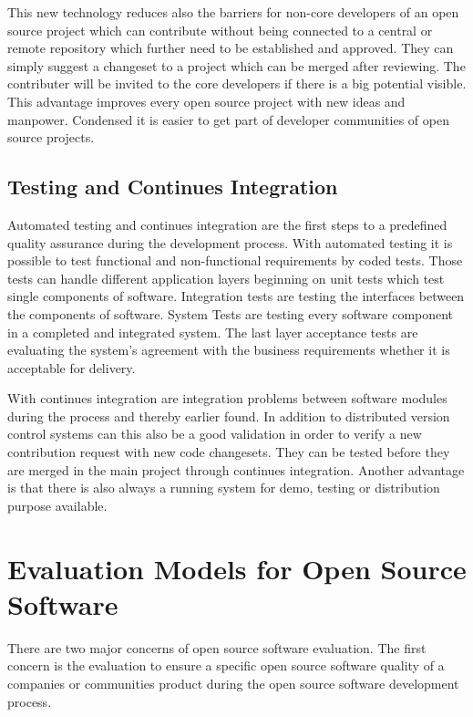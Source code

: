 \documentclass[DIV=calc,paper=a4,fontsize=9pt,twocolumn]{scrartcl}
\begin{document}
This new technology reduces also the barriers for non-core developers of an open source project which can contribute without being connected to a central or remote repository which further need to be established and approved. They can simply suggest a changeset to a project which can be merged after reviewing. The contributer will be invited to the core developers if there is a big potential visible. This advantage improves every open source project with new ideas and manpower. Condensed it is easier to get part of developer communities of open source projects. \citep{rodriguez2012distributed}

\subsection{Testing and Continues Integration}

Automated testing and continues integration are the first steps to a predefined quality assurance during the development process. With automated testing it is possible to test functional and non-functional requirements by coded tests. Those tests can handle different application layers beginning on unit tests which test single components of software. Integration tests are testing the interfaces between the components of software. System Tests are testing every software component in a completed and integrated system. The last layer acceptance tests are evaluating the system's agreement with the business requirements whether it is acceptable for delivery. \citep{abran2001guide}

With continues integration are integration problems between software modules during the process and thereby earlier found. In addition to distributed version control systems can this also be a good validation in order to verify a new contribution request with new code changesets. They can be tested before they are merged in the main project through continues integration. Another advantage is that there is also always a running system for demo, testing or distribution purpose available.

\section{Evaluation Models for Open Source Software}

There are two major concerns of open source software evaluation. The first concern is the evaluation to ensure a specific open source software quality of a companies or communities product during the open source software development process. 
\end{document}
